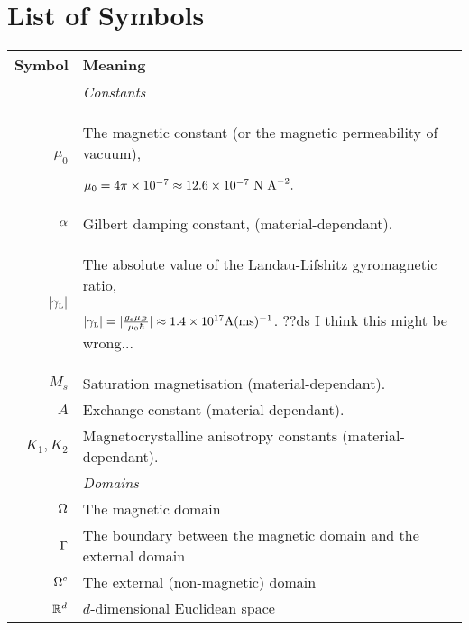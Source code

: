 

\section*{List of Symbols}

\renewcommand{\arraystretch}{1.2}

\newcommand{\hlinegap}[1]{\noalign{\medskip} & \emph{#1} \\ \hline \noalign{\smallskip}}

\begin{tabular}{r  p{12cm}} %

  \textbf{Symbol} & \textbf{Meaning} \\
  \hline\hline %

  \hlinegap{Constants}
  $\mu_0$ & The magnetic constant (or the magnetic permeability of vacuum),

  $\mu_0 = 4 \pi \times 10^{-7} \approx 12.6 \times 10^{-7} \text{ N A}^{-2}.$ \\
  $\alpha$ & Gilbert damping constant, (material-dependant). \\
  ${|\gamma_{\text{\tiny{L}}}|}$ & The absolute value of the Landau-Lifshitz gyromagnetic ratio,

  ${|\gamma_{\text{\tiny{L}}}|} = | \frac{g_e \mu_B}{\mu_0 \hbar} | \approx 1.4 \times 10^{17} {\text{A}(\text{ms})^{-1}}$. ??ds I think this might be wrong... \\

  $M_s$ & Saturation magnetisation (material-dependant). \\
  $A$ & Exchange constant (material-dependant). \\
  $K_1, K_2$ & Magnetocrystalline anisotropy constants (material-dependant). \\

  \hlinegap{Domains}
  $\Omega$ & The magnetic domain \\
  ${\Gamma}$ & The boundary between the magnetic domain and the external domain \\
  ${\Omega^c}$ & The external (non-magnetic) domain \\
  $\mathbb{R}^d$ & $d$-dimensional Euclidean space \\


\end{tabular}

